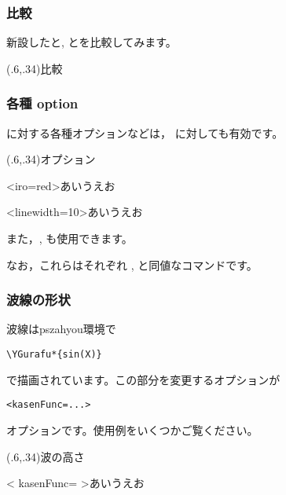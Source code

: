 \documentclass[a4j]{jarticle}
\begin{document}
\subsubsection{比較}
新設したと, とを比較してみます。

\begin{showEx}(.6,.34){比較}


\end{showEx}

\subsubsection{各種 option}
に対する各種オプションなどは，
に対しても有効です。

\begin{showEx}(.6,.34){オプション}


\psnamikasen<iro=red>{あいうえお}

\psnamikasen<linewidth=10>{あいうえお}
\end{showEx}

また，, も使用できます。

なお，これらはそれぞれ , 
と同値なコマンドです。

\subsubsection{波線の形状}
波線は\textsf{pszahyou}環境で
\begin{jquote}
\begin{verbatim}
\YGurafu*{sin(X)}
\end{verbatim}
\end{jquote}
で描画されています。この部分を変更するオプションが
\begin{jquote}
\begin{verbatim}
<kasenFunc=...>
\end{verbatim}
\end{jquote}
オプションです。使用例をいくつかご覧ください。

\begin{showEx}(.6,.34){波の高さ}

\psnamikasen<%
  kasenFunc={}%
>{あいうえお}
\end{showEx}
\end{document}
